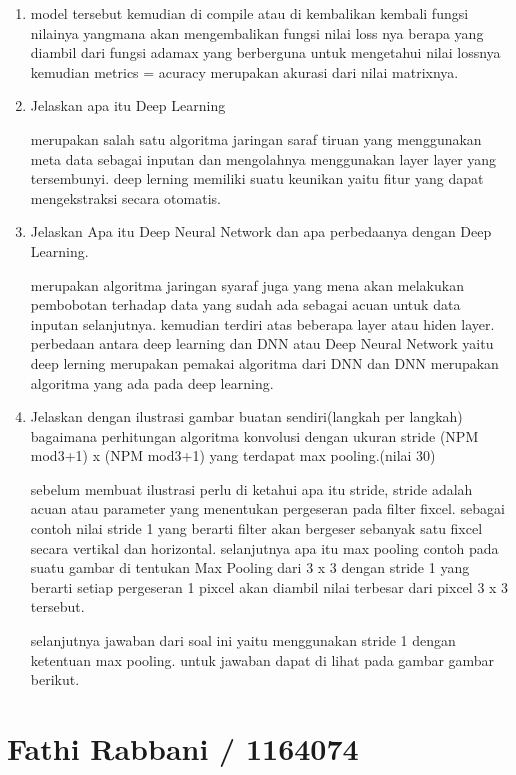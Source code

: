 \begin{enumerate}
\item model tersebut kemudian di compile atau di kembalikan kembali fungsi nilainya yangmana akan mengembalikan fungsi nilai loss nya berapa yang diambil dari fungsi adamax yang berberguna untuk  mengetahui nilai lossnya kemudian metrics = acuracy merupakan akurasi dari nilai matrixnya.

\item Jelaskan apa itu Deep Learning \par
merupakan salah satu algoritma jaringan saraf tiruan yang menggunakan meta data sebagai inputan dan mengolahnya menggunakan layer layer yang tersembunyi. deep lerning memiliki suatu keunikan yaitu fitur yang dapat mengekstraksi secara otomatis.

\item Jelaskan Apa itu Deep Neural Network dan apa perbedaanya dengan Deep Learning.\par
merupakan algoritma jaringan syaraf juga yang mena akan melakukan pembobotan terhadap data yang sudah ada sebagai acuan untuk data inputan selanjutnya. kemudian terdiri atas beberapa layer atau hiden layer. perbedaan antara deep learning dan DNN atau Deep Neural Network yaitu deep lerning merupakan pemakai algoritma dari DNN dan DNN merupakan algoritma yang ada pada deep learning.

\item Jelaskan dengan ilustrasi gambar buatan sendiri(langkah per langkah) bagaimana perhitungan algoritma konvolusi dengan ukuran stride (NPM mod3+1) x (NPM mod3+1) yang terdapat max pooling.(nilai 30)\par
 sebelum membuat ilustrasi perlu di ketahui apa itu stride, stride adalah acuan atau parameter yang menentukan pergeseran pada filter fixcel. sebagai contoh nilai stride 1 yang berarti filter akan bergeser sebanyak satu fixcel secara vertikal dan horizontal. selanjutnya apa itu max pooling contoh pada suatu gambar di tentukan Max Pooling dari 3 x 3 dengan stride 1 yang berarti setiap pergeseran 1 pixcel akan diambil nilai terbesar dari pixcel 3 x 3 tersebut.\par

selanjutnya jawaban dari soal ini yaitu menggunakan stride 1 dengan ketentuan max pooling. untuk jawaban dapat di lihat pada gambar gambar berikut. 

\end{enumerate}

\section{Fathi Rabbani / 1164074}
